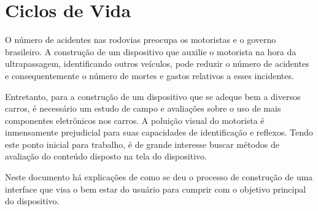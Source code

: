 \chapter{Ciclos de Vida}

O número de acidentes nas rodovias preocupa os motoristas e o governo brasileiro. A construção de um dispositivo que auxilie o motorista na hora da ultrapassagem, identificando outros veículos, pode reduzir o número de acidentes e consequentemente o número de mortes e gastos relativos a esses incidentes.

Entretanto, para a construção de um dispositivo que se adeque bem a diversos carros, é necessário um estudo de campo e avaliações sobre o uso de mais componentes eletrônicos nos carros. A poluição visual do motorista é inmensamente prejudicial para suas capacidades de identificação e reflexos. Tendo este ponto inicial para trabalho, é de grande interesse buscar métodos de avaliação do conteúdo disposto na tela do dispositivo.

Neste documento há explicações de como se deu o processo de construção de uma interface que visa o bem estar do usuário  para cumprir com o objetivo principal do dispositivo.

